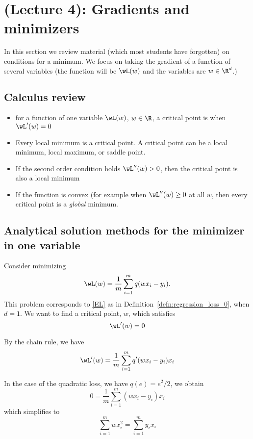 \documentclass[12pt]{amsart}
\begin{document}
\section{(Lecture 4): Gradients and minimizers}

In this section we review material (which most students have forgotten) on conditions for a minimum.
We focus on taking the gradient of a function of several variables (the function will be $\wL(w)$ and the variables are $w\in \R^d$.)

\subsection{Calculus review}\label{sec:calc.review}

\begin{itemize}
	\item for a function of one variable $\wL(w)$, $w \in \R$, a critical point is when $\wL'(w)=0$
	\item Every local minimum is a critical point.  A critical point can be a local minimum, local maximum, or saddle point.  	
	\item If the second order condition holds $\wL''(w) > 0$, then the critical point is also a local minimum
	\item If the function is convex (for example when $\wL''(w) \geq 0$ at all $w$, then every critical point is a \emph{global} minimum.
\end{itemize}



\subsection{Analytical solution methods for the minimizer in one variable}
Consider minimizing	
\[
	\wL(w) = \frac 1 m \sum_{i=1}^m q(wx_i -y_i).
	\]
This problem corresponds to \eqref{EL} as in Definition~\ref{defn:regression_loss_0}, when $d=1$.  
We want to find a critical point, $w$, which satisfies
\[
\wL'(w) = 0
\]

By the chain rule, we have 
\begin{align}
	\wL'(w) =   \frac 1 m \sum_{i=1}^m q'(wx_i -y_i) x_i
\end{align}

In the case of the quadratic loss, we have $q(e) = e^2/2$,  we obtain
\begin{equation}
	0 = \frac{1}{m} \sum_{i=1}^m (wx_i-y_i) x_i
\end{equation}
which simplifies to 
\begin{equation}\label{quad.1d.minimizer}
	 \sum_{i=1}^m wx_i^2 = 	 \sum_{i=1}^m y_i x_i
\end{equation}
\end{document}
